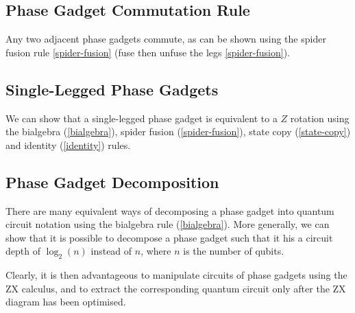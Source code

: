 

\subsection{Phase Gadget Commutation Rule}%
\label{phase-gadget-commutation}

Any two adjacent phase gadgets commute, as can be shown using the spider fusion rule \ref{spider-fusion} (fuse then unfuse the legs \ref{spider-fusion}).



\subsection{Single-Legged Phase Gadgets}%
\label{phase-gadget-single-leg}

We can show that a single-legged phase gadget is equivalent to a $Z$ rotation using the bialgebra (\ref{bialgebra}), spider fusion (\ref{spider-fusion}), state copy (\ref{state-copy}) and identity (\ref{identity}) rules.



\subsection{Phase Gadget Decomposition}%
\label{phase-gadget-decomposition}

There are many equivalent ways of decomposing a phase gadget into quantum circuit notation using the bialgebra rule (\ref{bialgebra}). More generally, we can show that it is possible to decompose a phase gadget such that it his a circuit depth of $\log_2(n)$ instead of $n$, where $n$ is the number of qubits.


Clearly, it is then advantageous to manipulate circuits of phase gadgets using the ZX calculus, and to extract the corresponding quantum circuit only after the ZX diagram has been optimised.
